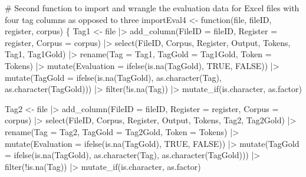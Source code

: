 \documentclass[
  letterpaper,
  DIV=11,
  numbers=noendperiod]{scrreprt}
\newenvironment{Shaded}{\begin{snugshade}}{\end{snugshade}}
\newcommand{\AttributeTok}[1]{\textcolor[rgb]{0.40,0.45,0.13}{#1}}
\newcommand{\CommentTok}[1]{\textcolor[rgb]{0.37,0.37,0.37}{#1}}
\newcommand{\ConstantTok}[1]{\textcolor[rgb]{0.56,0.35,0.01}{#1}}
\newcommand{\ControlFlowTok}[1]{\textcolor[rgb]{0.00,0.23,0.31}{#1}}
\newcommand{\FunctionTok}[1]{\textcolor[rgb]{0.28,0.35,0.67}{#1}}
\newcommand{\NormalTok}[1]{\textcolor[rgb]{0.00,0.23,0.31}{#1}}
\newcommand{\OtherTok}[1]{\textcolor[rgb]{0.00,0.23,0.31}{#1}}
\newcommand{\SpecialCharTok}[1]{\textcolor[rgb]{0.37,0.37,0.37}{#1}}
\begin{document}
\begin{Shaded}
\begin{Highlighting}[]
\CommentTok{\# Second function to import and wrangle the evaluation data for Excel files with four tag columns as opposed to three}
\NormalTok{importEval4 }\OtherTok{\textless{}{-}} \ControlFlowTok{function}\NormalTok{(file, fileID, register, corpus) \{}
\NormalTok{  Tag1 }\OtherTok{\textless{}{-}}\NormalTok{ file }\SpecialCharTok{|\textgreater{}} 
  \FunctionTok{add\_column}\NormalTok{(}\AttributeTok{FileID =}\NormalTok{ fileID, }\AttributeTok{Register =}\NormalTok{ register, }\AttributeTok{Corpus =}\NormalTok{ corpus) }\SpecialCharTok{|\textgreater{}}
  \FunctionTok{select}\NormalTok{(FileID, Corpus, Register, Output, Tokens, Tag1, Tag1Gold) }\SpecialCharTok{|\textgreater{}} 
  \FunctionTok{rename}\NormalTok{(}\AttributeTok{Tag =}\NormalTok{ Tag1, }\AttributeTok{TagGold =}\NormalTok{ Tag1Gold, }\AttributeTok{Token =}\NormalTok{ Tokens) }\SpecialCharTok{|\textgreater{}} 
  \FunctionTok{mutate}\NormalTok{(}\AttributeTok{Evaluation =} \FunctionTok{ifelse}\NormalTok{(}\FunctionTok{is.na}\NormalTok{(TagGold), }\ConstantTok{TRUE}\NormalTok{, }\ConstantTok{FALSE}\NormalTok{)) }\SpecialCharTok{|\textgreater{}} 
  \FunctionTok{mutate}\NormalTok{(}\AttributeTok{TagGold =} \FunctionTok{ifelse}\NormalTok{(}\FunctionTok{is.na}\NormalTok{(TagGold), }\FunctionTok{as.character}\NormalTok{(Tag), }\FunctionTok{as.character}\NormalTok{(TagGold))) }\SpecialCharTok{|\textgreater{}}
  \FunctionTok{filter}\NormalTok{(}\SpecialCharTok{!}\FunctionTok{is.na}\NormalTok{(Tag)) }\SpecialCharTok{|\textgreater{}} 
  \FunctionTok{mutate\_if}\NormalTok{(is.character, as.factor)}
  
\NormalTok{  Tag2 }\OtherTok{\textless{}{-}}\NormalTok{ file }\SpecialCharTok{|\textgreater{}} 
  \FunctionTok{add\_column}\NormalTok{(}\AttributeTok{FileID =}\NormalTok{ fileID, }\AttributeTok{Register =}\NormalTok{ register, }\AttributeTok{Corpus =}\NormalTok{ corpus) }\SpecialCharTok{|\textgreater{}}
  \FunctionTok{select}\NormalTok{(FileID, Corpus, Register, Output, Tokens, Tag2, Tag2Gold) }\SpecialCharTok{|\textgreater{}} 
  \FunctionTok{rename}\NormalTok{(}\AttributeTok{Tag =}\NormalTok{ Tag2, }\AttributeTok{TagGold =}\NormalTok{ Tag2Gold, }\AttributeTok{Token =}\NormalTok{ Tokens) }\SpecialCharTok{|\textgreater{}} 
  \FunctionTok{mutate}\NormalTok{(}\AttributeTok{Evaluation =} \FunctionTok{ifelse}\NormalTok{(}\FunctionTok{is.na}\NormalTok{(TagGold), }\ConstantTok{TRUE}\NormalTok{, }\ConstantTok{FALSE}\NormalTok{)) }\SpecialCharTok{|\textgreater{}} 
  \FunctionTok{mutate}\NormalTok{(}\AttributeTok{TagGold =} \FunctionTok{ifelse}\NormalTok{(}\FunctionTok{is.na}\NormalTok{(TagGold), }\FunctionTok{as.character}\NormalTok{(Tag), }\FunctionTok{as.character}\NormalTok{(TagGold))) }\SpecialCharTok{|\textgreater{}}
  \FunctionTok{filter}\NormalTok{(}\SpecialCharTok{!}\FunctionTok{is.na}\NormalTok{(Tag)) }\SpecialCharTok{|\textgreater{}} 
  \FunctionTok{mutate\_if}\NormalTok{(is.character, as.factor)}


\end{Highlighting}
\end{Shaded}
\end{document}
